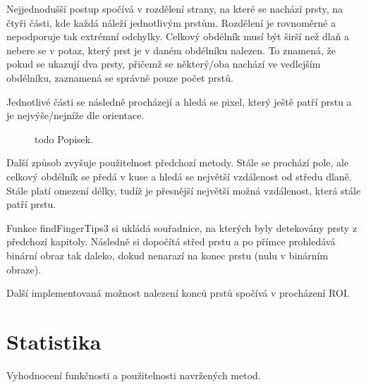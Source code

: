 Nejjednodušší postup spočívá v rozdělení strany, na které se nachází prsty, na čtyři části, kde každá náleží jednotlivým prstům. Rozdělení je rovnoměrné a nepodporuje tak extrémní odchylky. Celkový obdélník musí být širší než dlaň a nebere se v potaz, který prst je v daném obdélníku nalezen. To znamená, že pokud se ukazují dva prsty, přičemž se některý/oba nachází ve vedlejším obdélníku, zaznamená se správně pouze počet prstů.

Jednotlivé části se následně procházejí a hledá se pixel, který ještě patří prstu a je nejvýše/nejníže dle orientace.\\

\begin{figure}[htp]
\centering
{}
\caption{todo Popisek.}
\label{fig:findFingerTips}
\end{figure}

Další způsob zvyšuje použitelnost předchozí metody. Stále se prochází pole, ale celkový obdélník se předá v kuse a hledá se největší vzdálenost od středu dlaně. Stále platí omezení délky, tudíž je přesnější největší možná vzdálenost, která stále patří prstu.

Funkce findFingerTips3 si ukládá souřadnice, na kterých byly detekovány prsty z předchozí kapitoly. Následně si dopočítá střed prstu a po přímce prohledává binární obraz tak daleko, dokud nenarazí na konec prstu (nulu v binárním obraze). 

Další implementovaná možnost nalezení konců prstů spočívá v procházení ROI.


\section{Statistika}
Vyhodnocení funkčnosti a použitelnosti navržených metod.

\endinput
